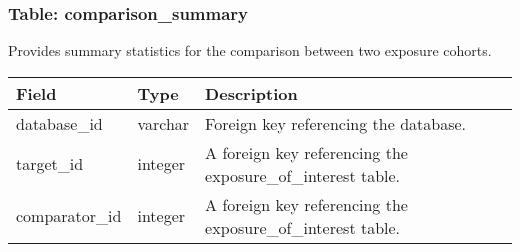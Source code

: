 \documentclass[
]{article}
\begin{document}
\hypertarget{table-comparison_summary}{%
\subsubsection{Table:
comparison\_summary}\label{table-comparison_summary}}

Provides summary statistics for the comparison between two exposure
cohorts.

\begin{longtable}[]{@{}lll@{}}
\toprule
\begin{minipage}[b]{0.23\columnwidth}\raggedright
Field\strut
\end{minipage} & \begin{minipage}[b]{0.18\columnwidth}\raggedright
Type\strut
\end{minipage} & \begin{minipage}[b]{0.50\columnwidth}\raggedright
Description\strut
\end{minipage}\tabularnewline
\midrule
\endhead
\begin{minipage}[t]{0.23\columnwidth}\raggedright
database\_id\strut
\end{minipage} & \begin{minipage}[t]{0.18\columnwidth}\raggedright
varchar\strut
\end{minipage} & \begin{minipage}[t]{0.50\columnwidth}\raggedright
Foreign key referencing the database.\strut
\end{minipage}\tabularnewline
\begin{minipage}[t]{0.23\columnwidth}\raggedright
target\_id\strut
\end{minipage} & \begin{minipage}[t]{0.18\columnwidth}\raggedright
integer\strut
\end{minipage} & \begin{minipage}[t]{0.50\columnwidth}\raggedright
A foreign key referencing the exposure\_of\_interest table.\strut
\end{minipage}\tabularnewline
\begin{minipage}[t]{0.23\columnwidth}\raggedright
comparator\_id\strut
\end{minipage} & \begin{minipage}[t]{0.18\columnwidth}\raggedright
integer\strut
\end{minipage} & \begin{minipage}[t]{0.50\columnwidth}\raggedright
A foreign key referencing the exposure\_of\_interest table.\strut
\end{minipage}\tabularnewline

\end{longtable}
\end{document}
